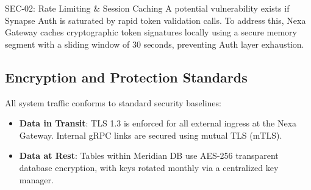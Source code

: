 \documentclass[11pt,a4paper]{article}
\begin{document}
\begin{securityrisk}{SEC-02: Rate Limiting \& Session Caching}
A potential vulnerability exists if Synapse Auth is saturated by rapid token validation calls. To address this, Nexa Gateway caches cryptographic token signatures locally using a secure memory segment with a sliding window of 30 seconds, preventing Auth layer exhaustion.
\end{securityrisk}

\subsection{Encryption and Protection Standards}
All system traffic conforms to standard security baselines:
\begin{itemize}
  \item \textbf{Data in Transit}: TLS 1.3 is enforced for all external ingress at the Nexa Gateway. Internal gRPC links are secured using mutual TLS (mTLS).
  \item \textbf{Data at Rest}: Tables within Meridian DB use AES-256 transparent database encryption, with keys rotated monthly via a centralized key manager.
\end{itemize}
\end{document}
